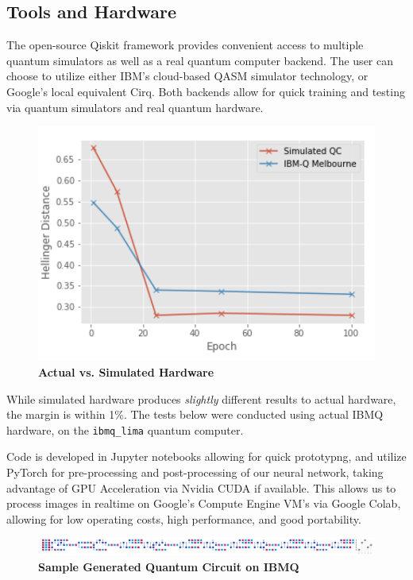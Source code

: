 \documentclass{scrartcl}
\begin{document}
\subsection{Tools and Hardware}
\label{sec:orgd350921}

The open-source Qiskit framework provides convenient access to multiple quantum simulators as well as a real quantum computer backend. The user can choose to utilize either IBM's cloud-based QASM simulator technology, or Google's local equivalent Cirq. Both backends allow for quick training and testing via quantum simulators and real quantum hardware.

\begin{figure}[htbp]
\centering
\includegraphics[width=.9\linewidth]{./assets/simulatedvsreal.png}
\caption{\textbf{Actual vs. Simulated Hardware}}
\end{figure}

While simulated hardware produces \emph{slightly} different results to actual hardware, the margin is within 1\%. The tests below were conducted using actual IBMQ hardware, on the \verb~ibmq_lima~ quantum computer.

Code is developed in Jupyter notebooks allowing for quick prototypng, and utilize PyTorch for pre-processing and post-processing of our neural network, taking advantage of GPU Acceleration via Nvidia CUDA if available. This allows us to process images in realtime on Google's Compute Engine VM's via Google Colab, allowing for low operating costs, high performance, and good portability.

\begin{figure}[htbp]
\centering
\includegraphics[width=.9\linewidth]{./assets/circuit.png}
\caption{\textbf{Sample Generated Quantum Circuit on IBMQ}}
\end{figure}
\end{document}
